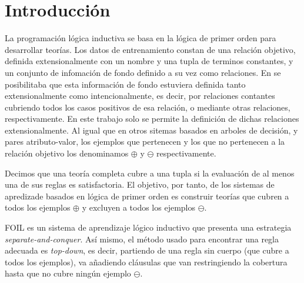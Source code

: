 \section{Introducción}
La programación lógica inductiva se basa en la lógica de primer orden para desarrollar teorías. Los datos de entrenamiento constan de una relación objetivo, definida extensionalmente con un nombre y una tupla de terminos constantes, y un conjunto de infomación de fondo definido a su vez como relaciones. En \cite{Quinlan1995} se posibilitaba que esta información de fondo estuviera definida tanto extensionalmente como intencionalmente, es decir, por relaciones contantes cubriendo todos los casos positivos de esa relación, o mediante otras relaciones, respectivamente. En este trabajo solo se permite la definición de dichas relaciones extensionalmente. Al igual que en otros sitemas basados en arboles de decisión, y pares atributo-valor, los ejemplos que pertenecen y los que no pertenecen a la relación objetivo los denominamos $\oplus$ y $\ominus$ respectivamente.


Decimos que una teoría completa cubre a una tupla si la evaluación de al menos una de sus reglas es satisfactoria. El objetivo, por tanto, de los sistemas de apredizade basados en lógica de primer orden es construir teorías que cubren a todos los ejemplos $\oplus$ y excluyen a todos los ejemplos $\ominus$.


FOIL es un sistema de aprendizaje lógico inductivo que presenta una estrategia \emph{separate-and-conquer}. Así mismo, el método usado para encontrar una regla adecuada es \emph{top-down}, es decir, partiendo de una regla sin cuerpo (que cubre a todos los ejemplos), va añadiendo cláusulas que van restringiendo la cobertura hasta que no cubre ningún ejemplo $\ominus$.
